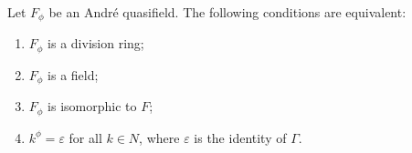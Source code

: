 Let $F_\phi$ be an André quasifield. The following conditions are equivalent:
\begin{enumerate}
\item $F_\phi$ is a division ring;
\item $F_\phi$ is a field;
\item $F_\phi$ is isomorphic to $F$;
\item $k^\phi = \varepsilon$ for all $k \in N$, where $\varepsilon$ is the identity of $\Gamma$.
\end{enumerate}
